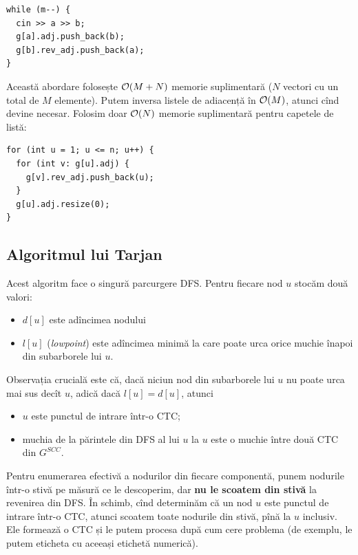 \documentclass[../main.tex]{subfiles}
\begin{document}
\begin{verbatim}
while (m--) {
  cin >> a >> b;
  g[a].adj.push_back(b);
  g[b].rev_adj.push_back(a);
}
\end{verbatim}

Această abordare folosește $\mathcal{O}(M + N)$ memorie suplimentară ($N$ vectori cu un total de $M$ elemente). Putem inversa listele de adiacență în $\mathcal{O}(M)$, atunci cînd devine necesar. Folosim doar $\mathcal{O}(N)$ memorie suplimentară pentru capetele de listă:

\begin{verbatim}
for (int u = 1; u <= n; u++) {
  for (int v: g[u].adj) {
    g[v].rev_adj.push_back(u);
  }
  g[u].adj.resize(0);
}
\end{verbatim}

\subsection{Algoritmul lui Tarjan}

Acest algoritm face o singură parcurgere DFS. Pentru fiecare nod $u$ stocăm două valori:

\begin{itemize}
  \item $d[u]$ este adîncimea nodului
  \item $l[u]$ (\textit{lowpoint}) este adîncimea minimă la care poate urca orice muchie înapoi din subarborele lui $u$.
\end{itemize}

Observația crucială este că, dacă niciun nod din subarborele lui $u$ nu poate urca mai sus decît $u$, adică dacă $l[u] = d[u]$, atunci


\begin{itemize}
  \item $u$ este punctul de intrare într-o CTC;
  \item muchia de la părintele din DFS al lui $u$ la $u$ este o muchie între două CTC din $G^{SCC}$.
\end{itemize}

Pentru enumerarea efectivă a nodurilor din fiecare componentă, punem nodurile într-o stivă pe măsură ce le descoperim, dar \textbf{nu le scoatem din stivă} la revenirea din DFS. În schimb, cînd determinăm că un nod $u$ este punctul de intrare într-o CTC, atunci scoatem toate nodurile din stivă, pînă la $u$ inclusiv. Ele formează o CTC și le putem procesa după cum cere problema (de exemplu, le putem eticheta cu aceeași etichetă numerică).
\end{document}
